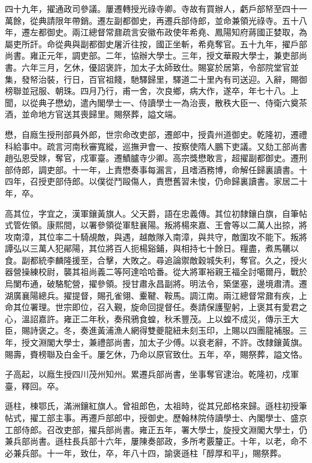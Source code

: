 \begin{pinyinscope}
四十九年，擢通政司參議。屢遷轉授光祿寺卿。寺故有買辦人，虧戶部帑至四十一萬餘，從典請限年帶銷。遷左副都御史，再遷兵部侍郎，並命兼領光祿寺。五十八年，遷左都御史。兩江總督常鼐疏言安徽布政使年希堯、鳳陽知府蔣國正婪取，為屬吏所訐。命從典與副都御史屠沂往按，國正坐斬，希堯奪官。五十九年，擢戶部尚書。雍正元年，調吏部。二年，協辦大學士。三年，授文華殿大學士，兼吏部尚書。六年三月，乞休，優詔褒許，加太子太師致仕。賜宴於居第，令部院堂官並集，發帑治裝，行日，百官祖餞，馳驛歸里，驛道二十里內有司送迎。入辭，賜御榜聯並冠服、朝珠。四月乃行，甫一舍，次良鄉，病大作，遂卒，年七十八。上聞，以從典子懋幼，遣內閣學士一、侍讀學士一為治喪，散秩大臣一、侍衛六奠茶酒，並命地方官送其喪歸里。賜祭葬，謚文端。

懋，自廕生授刑部員外郎，世宗命改吏部，遷郎中，授貴州道御史。乾隆初，遷禮科給事中。疏言河南秋審寬縱，巡撫尹會一、按察使隋人鵬下吏議。又劾工部尚書趙弘恩受賕，奪官，戍軍臺。遷鰿臚寺少卿。高宗獎懋敢言，超擢副都御史。遷刑部侍郎，調吏部。十一年，上責懋奏事每漏言，且嗜酒務博，命解任歸裏讀書。十四年，召授吏部侍郎。以僕從鬥毆傷人，責懋舊習未悛，仍命歸裏讀書。家居二十年，卒。

高其位，字宜之，漢軍鑲黃旗人。父天爵，語在忠義傳。其位初隸鑲白旗，自筆帖式管佐領。康熙間，以署參領從軍駐襄陽。叛將楊來嘉、王會等以二萬人出掠，將攻南漳，其位率二十騎覘敵，與遇，越敵隊入南漳，與共守，敵圍攻不能下。叛將譚弘以三萬人犯鄖陽，其位將百人扼楊谿鋪，與相持七十餘日。糧盡，煮馬韉以食。副都統李麟隆援至，合擊，大敗之。尋追論禦敵穀城失利，奪官。久之，授火器營操練校尉，襲其祖尚義二等阿達哈哈番。從大將軍裕親王福全討噶爾丹，戰於烏闌布通，破駱駝營，擢參領。授甘肅永昌副將。明法令，築堡塞，邊境肅清。遷湖廣襄陽總兵。擢提督，賜孔雀翎、櫜鞬、鞍馬。調江南。兩江總督常鼐有疾，上命其位署理。世宗即位，召入覲，旋命回提督任。奏請保護聖躬，上褒其有愛君之心，溫詔嘉許。雍正二年秋，奏飛鴉食蝗，秋禾豐茂。上以蝗不成災，傳示王大臣，賜詩褒之。冬，奏進黃浦漁人網得雙夔龍紐未刻玉印，上賜以四團龍補服。三年，授文淵閣大學士，兼禮部尚書，加太子少傅。以衰老辭，不許。改隸鑲黃旗。賜壽，賚榜聯及白金千。屢乞休，乃命以原官致仕。五年，卒，賜祭葬，謚文恪。

子高起，以廕生授四川茂州知州。累遷兵部尚書，坐事奪官逮治。乾隆初，戍軍臺，釋回。卒。

遜柱，棟鄂氏，滿洲鑲紅旗人。曾祖郎色，太祖時，從其兄郎格來歸。遜柱初授筆帖式，擢工部主事。再遷戶部郎中，授御史。歷翰林院侍讀學士、內閣學士、盛京工部侍郎。召改吏部，擢兵部尚書。雍正五年，署大學士，旋授文淵閣大學士，仍兼兵部尚書。遜柱長兵部十六年，屢陳奏部政，多所考覈釐正。十年，以老，命不必兼兵部。十一年，致仕，卒，年八十四，諭褒遜柱「醇厚和平」，賜祭葬。


\end{pinyinscope}
